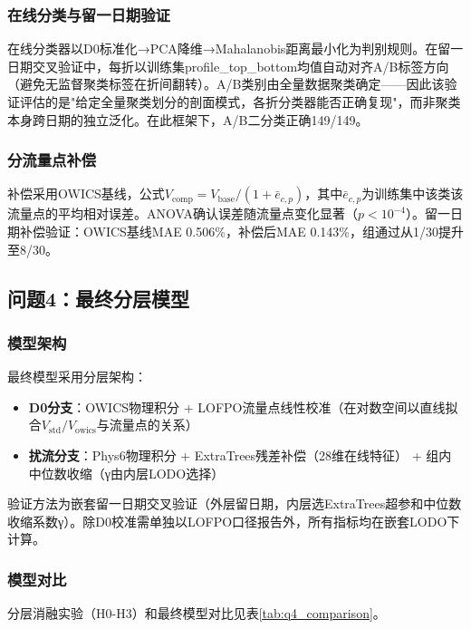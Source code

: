 \subsubsection{在线分类与留一日期验证}

在线分类器以D0标准化→PCA降维→Mahalanobis距离最小化为判别规则。在留一日期交叉验证中，每折以训练集profile\_top\_bottom均值自动对齐A/B标签方向（避免无监督聚类标签在折间翻转）。A/B类别由全量数据聚类确定——因此该验证评估的是"给定全量聚类划分的剖面模式，各折分类器能否正确复现"，而非聚类本身跨日期的独立泛化。在此框架下，A/B二分类正确149/149。

\subsubsection{分流量点补偿}

补偿采用OWICS基线，公式$V_{\text{comp}} = V_{\text{base}} / (1 + \bar{e}_{c,p})$，其中$\bar{e}_{c,p}$为训练集中该类该流量点的平均相对误差。ANOVA确认误差随流量点变化显著（$p < 10^{-4}$）。留一日期补偿验证：OWICS基线MAE 0.506\%，补偿后MAE 0.143\%，组通过从1/30提升至8/30。

\subsection{问题4：最终分层模型}

\subsubsection{模型架构}

最终模型采用分层架构：
\begin{itemize}
    \item \textbf{D0分支}：OWICS物理积分 + LOFPO流量点线性校准（在对数空间以直线拟合$V_{\text{std}}/V_{\text{owics}}$与流量点的关系）
    \item \textbf{扰流分支}：Phys6物理积分 + ExtraTrees残差补偿（28维在线特征） + 组内中位数收缩（γ由内层LODO选择）
\end{itemize}

验证方法为嵌套留一日期交叉验证（外层留日期，内层选ExtraTrees超参和中位数收缩系数γ）。除D0校准需单独以LOFPO口径报告外，所有指标均在嵌套LODO下计算。

\subsubsection{模型对比}

分层消融实验（H0-H3）和最终模型对比见表\ref{tab:q4_comparison}。


